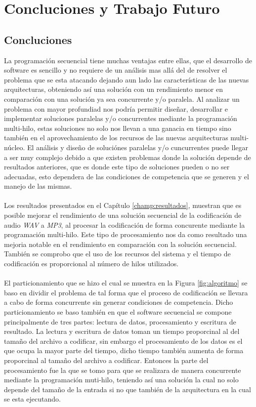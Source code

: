 \chapter{Concluciones y Trabajo Futuro}
\label{champ:concluciones}
\bigskip
\barra
\bigskip
\section{Concluciones}
La programación secuencial tiene muchas ventajas entre ellas, que el desarrollo de software es sencillo y no requiere de un análisis mas allá del de resolver el problema que se esta atacando dejando aun lado las características de las nuevas arquitecturas, obteniendo así una solución con un rendimiento menor en comparación con una solución ya sea concurrente y/o paralela. Al analizar un problema con mayor profundiad nos podría permitir diseñar, desarrollar e implementar soluciones paralelas y/o concurrentes mediante la programación multi-hilo, estas soluciones no solo nos llevan a una ganacia en tiempo sino también en el aprovechamiento de los recursos de las nuevas arquitecturas multi-núcleo. El análisis y diseño de soluciónes paralelas y/o cuncurrentes puede llegar a ser muy complejo debido a que existen problemas donde la solución depende de resultados anteriores, que es donde este tipo de soluciones pueden o no ser adecuadas, esto dependera de las condiciones de competencia que se generen y el manejo de las mismas.\\\\
Los resultados presentados en el Capítulo \ref{champ:resultados}, muestran que es posible mejorar el rendimiento de una solución secuencial de la codificación de audio \textit{WAV} a \textit{MP3}, al procesar la codificación de forma concurente mediante la programación multi-hilo. Este tipo de procesamiento nos da como resultado una mejoria notable en el rendimiento en comparación con la solución secuencial. También se comprobo que el uso de los recursos del sistema y el tiempo de codificación es proporcional al número de hilos utilizados.\\\\
El particionamiento que se hizo el cual se muestra en la Figura \ref{fig:algoritmo} se baso en dividir el problema de tal forma que el proceso de codificación se llevara a cabo de forma concurrente sin generar condiciones de competencia. Dicho particionamiento se baso también en que el software secuencial se compone principalmente de tres partes: lectura de datos, procesamiento y escritura de resultado. La lectura y escritura de datos toman un tiempo proporcinal al del tamaño del archivo a codificar, sin embargo el procesamiento de los datos es el que ocupa la mayor parte del tiempo, dicho tiempo también aumenta de forma proporcinal al tamaño del archivo a codificar. Entonces la parte del procesamiento fue la que se tomo para que se realizara de manera concurrente mediante la programación muti-hilo, teniendo así una solución la cual no solo depende del tamaño de la entrada si no que también de la arquitectura en la cual se esta ejecutando.\\\\
